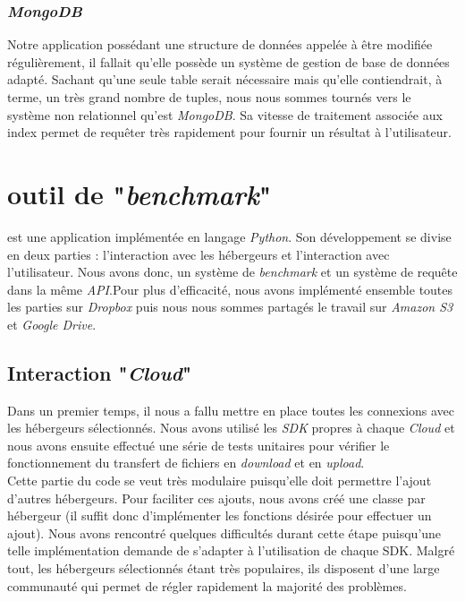 \documentclass[10pt]{article}
\begin{document}
\subsubsection{\textit{MongoDB}}

Notre application possédant une structure de données appelée à être modifiée
régulièrement, il fallait qu'elle possède un système de gestion de base de
données adapté. Sachant qu'une seule table serait nécessaire mais qu'elle
contiendrait, à terme, un très grand nombre de tuples, nous nous sommes tournés
vers le système non relationnel qu'est \textit{MongoDB}. Sa vitesse de
traitement associée aux index permet de requêter très rapidement pour fournir
un résultat à l'utilisateur.

\section{\KYD outil de "\textit{benchmark}" }

\KYD est une application implémentée en langage \textit{Python}. Son
développement se divise en deux parties : l'interaction avec les hébergeurs et
l'interaction avec l'utilisateur. Nous avons donc, un système de
\textit{benchmark} et un système de requête dans la même \textit{API}.Pour plus
d'efficacité, nous avons implémenté ensemble toutes les parties sur
\textit{Dropbox} puis nous nous sommes partagés le travail sur \textit{Amazon
S3} et \textit{Google Drive}.

\subsection{Interaction "\textit{Cloud}"}

Dans un premier temps, il nous a fallu mettre en place toutes les connexions
avec les hébergeurs sélectionnés. Nous avons utilisé les \textit{SDK} propres à
chaque \textit{Cloud} et nous avons ensuite effectué une série de tests
unitaires pour vérifier le fonctionnement du transfert de fichiers en
\textit{download} et en \textit{upload}.\\

Cette partie du code se veut très modulaire puisqu'elle doit permettre l'ajout
d'autres hébergeurs. Pour faciliter ces ajouts, nous avons créé une classe par
hébergeur (il suffit donc d'implémenter les fonctions désirée pour effectuer un
ajout). Nous avons rencontré quelques difficultés durant cette étape puisqu'une
telle implémentation demande de s'adapter à l'utilisation de chaque SDK. Malgré
tout, les hébergeurs sélectionnés étant très populaires, ils disposent d'une
large communauté qui permet de régler rapidement la majorité des problèmes.
\end{document}
